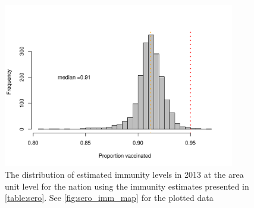 \documentclass{article}
\begin{document}
\begin{figure}[H]
     \begin{center}
     \includegraphics[width=0.9\textwidth]{census_immunity_age_hist.pdf}
     \end{center}
     \caption{The distribution of estimated immunity levels in 2013 at the area unit level for the nation using the immunity estimates presented in \autoref{table:sero}. See \autoref{fig:sero_imm_map} for the plotted data}
     \label{fig:sero_imm_hist}
\end{figure}
\end{document}

